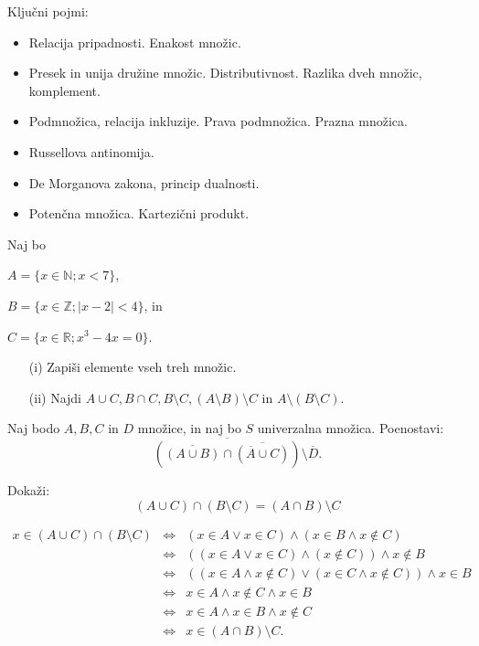 \documentclass[11pt,paper=b5,footinclude,headinclude]{scrbook} %
\newtheorem{ex}{Vaja\hypertarget{sol:\theex}}[chapter]
\begin{document}
Ključni pojmi:
\begin{itemize}
  \item Relacija pripadnosti. Enakost množic.
  \item Presek in unija družine množic. Distributivnost. Razlika dveh množic, komplement.
  \item Podmnožica, relacija inkluzije. Prava podmnožica. Prazna množica.
  \item Russellova antinomija.
  \item De Morganova zakona, princip dualnosti.
  \item Potenčna množica. Kartezični produkt.
\end{itemize}


\begin{ex}
 Naj bo 
 
 $A = \{ x \in \mathbb{N}; x < 7\}$,
 
 $B = \{x \in  \mathbb{Z}; |x - 2| < 4\}$, in
 
 $C = \{x \in\mathbb{R}; x^3 -  4x = 0\}$.
\begin{enumerate}
\item[(i)]  Zapiši elemente vseh treh množic.
\item[(ii)] Najdi $A \cup C, B \cap C, B \setminus C, (A \setminus B) \setminus C$ in $A \setminus (B \setminus C)$.
\end{enumerate}
\end{ex}
\begin{ex}
Naj bodo  $A, B, C$ in $D$ množice, in naj bo $S$ univerzalna množica. Poenostavi:
$$\overline{(\overline{(A\cup B)} \cap \overline{(\overline{A} \cup C)})}\setminus \overline{D}.$$

\end{ex}
\begin{ex}
Dokaži: $$(A\cup C)\cap (B\setminus C) = (A\cap B)\setminus C$$

\begin{sol}
\begin{eqnarray*}
x\in (A\cup C)\cap (B\setminus C) &\Leftrightarrow & (x\in A \vee x\in C) \wedge (x\in B \wedge x\notin C)\\
 &\Leftrightarrow & ((x\in A \vee x\in C) \wedge (x\notin C))\wedge x\notin B\\
&\Leftrightarrow & ((x\in A \wedge x\notin C) \vee (x\in C \wedge x\notin C)) \wedge
 x\in B\\
&\Leftrightarrow & x\in A \wedge x\notin C  \wedge x\in B\\
&\Leftrightarrow & x\in A \wedge x\in B  \wedge x\notin C \\
&\Leftrightarrow & x \in (A\cap B)\setminus C. 
\end{eqnarray*}
\end{sol}

\end{ex}
\end{document}
